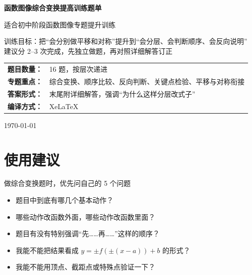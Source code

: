 \documentclass[11pt,a4paper,fontset=fandol]{ctexart}
\theoremstyle{formalexample}
\begin{document}
\thispagestyle{empty}
\begin{titlepage}
\centering
\vspace*{0.9cm}
\begin{tcolorbox}[
  enhanced,
  width=0.92\textwidth,
  colback=white,
  colframe=mainblue,
  boxrule=1pt,
  arc=0mm,
  left=6mm,
  right=6mm,
  top=8mm,
  bottom=8mm
]
\centering
{\fontsize{24}{30}\selectfont\bfseries 函数图像综合变换提高训练题单\par}
\vspace{0.6cm}
{\fontsize{17}{22}\selectfont 适合初中阶段函数图像专题提升训练\par}

\vspace{1cm}
\begin{tcolorbox}[colback=lightblue,colframe=mainblue,width=0.84\textwidth,boxrule=1pt]
\centering
{\large 训练目标：把“会分别做平移和对称”提升到“会分层、会判断顺序、会反向说明”}\\[0.35em]
{\normalsize 建议分 2--3 次完成，先独立做题，再对照详细解答订正}
\end{tcolorbox}

\vspace{1cm}
\renewcommand{\arraystretch}{1.42}
\begin{tabular}{>{\bfseries}p{3.5cm}p{8cm}}
题目数量： & 16 题，按层次递进 \\
专题重点： & 综合变换、顺序比较、反向判断、关键点检验、平移与对称衔接 \\
答案形式： & 末尾附详细解答，强调“为什么这样分层改式子” \\
编译方式： & XeLaTeX \\
\end{tabular}

\vspace{0.9cm}
{\large \today\par}
\end{tcolorbox}
\end{titlepage}

\tableofcontents
\newpage

\section{使用建议}

\begin{goalbox}{做综合变换题时，优先问自己的 5 个问题}
\begin{itemize}
  \item 题目中到底有哪几个基本动作？
  \item 哪些动作改函数外面，哪些动作改函数里面？
  \item 题目有没有特别强调“先……再……”这样的顺序？
  \item 我能不能把结果看成 \(y=\pm f(\pm(x-a))+b\) 的形式？
  \item 我能不能用顶点、截距点或特殊点验证一下？
\end{itemize}
\end{goalbox}
\end{document}
